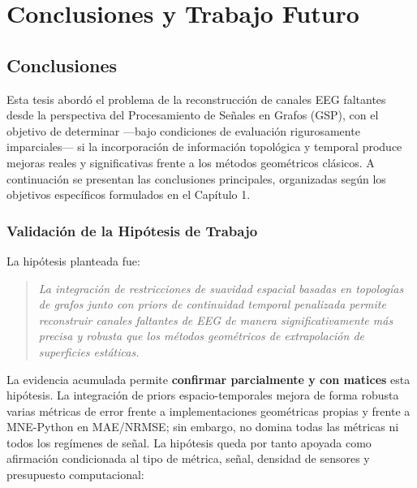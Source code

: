 \chapter{Conclusiones y Trabajo Futuro}

\section{Conclusiones}

Esta tesis abordó el problema de la reconstrucción de canales EEG faltantes desde la perspectiva del Procesamiento de Señales en Grafos (GSP), con el objetivo de determinar ---bajo condiciones de evaluación rigurosamente imparciales--- si la incorporación de información topológica y temporal produce mejoras reales y significativas frente a los métodos geométricos clásicos. A continuación se presentan las conclusiones principales, organizadas según los objetivos específicos formulados en el Capítulo 1.

\subsection{Validación de la Hipótesis de Trabajo}

La hipótesis planteada fue:
\begin{quote}
\emph{La integración de restricciones de suavidad espacial basadas en topologías de grafos junto con priors de continuidad temporal penalizada permite reconstruir canales faltantes de EEG de manera significativamente más precisa y robusta que los métodos geométricos de extrapolación de superficies estáticas.}
\end{quote}

La evidencia acumulada permite \textbf{confirmar parcialmente y con matices} esta hipótesis. La integración de priors espacio-temporales mejora de forma robusta varias métricas de error frente a implementaciones geométricas propias y frente a MNE-Python en MAE/NRMSE; sin embargo, no domina todas las métricas ni todos los regímenes de señal. La hipótesis queda por tanto apoyada como afirmación condicionada al tipo de métrica, señal, densidad de sensores y presupuesto computacional:

